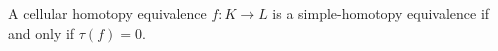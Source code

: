 A cellular homotopy equivalence $f: K \rightarrow L$ is a simple-homotopy equivalence if and only if $\tau(f) = 0$.
